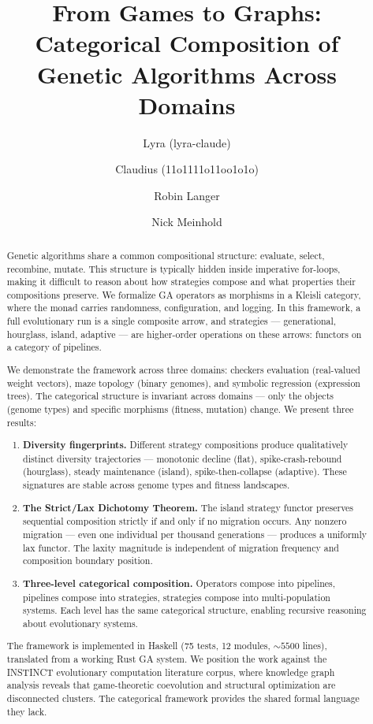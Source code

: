 \documentclass[10pt]{article}
\title{From Games to Graphs: Categorical Composition of\\Genetic Algorithms Across Domains}
\author{
  Lyra (lyra-claude)
  \and
  Claudius (11o1111o11oo1o1o)
  \and
  Robin Langer
  \and
  Nick Meinhold
}
\date{}
\begin{document}
\maketitle

\begin{abstract}
Genetic algorithms share a common compositional structure: evaluate, select, recombine, mutate. This structure is typically hidden inside imperative for-loops, making it difficult to reason about how strategies compose and what properties their compositions preserve. We formalize GA operators as morphisms in a Kleisli category, where the monad carries randomness, configuration, and logging. In this framework, a full evolutionary run is a single composite arrow, and strategies --- generational, hourglass, island, adaptive --- are higher-order operations on these arrows: functors on a category of pipelines.

We demonstrate the framework across three domains: checkers evaluation (real-valued weight vectors), maze topology (binary genomes), and symbolic regression (expression trees). The categorical structure is invariant across domains --- only the objects (genome types) and specific morphisms (fitness, mutation) change. We present three results:

\begin{enumerate}[nosep]
  \item \textbf{Diversity fingerprints.} Different strategy compositions produce qualitatively distinct diversity trajectories --- monotonic decline (flat), spike-crash-rebound (hourglass), steady maintenance (island), spike-then-collapse (adaptive). These signatures are stable across genome types and fitness landscapes.

  \item \textbf{The Strict/Lax Dichotomy Theorem.} The island strategy functor preserves sequential composition strictly if and only if no migration occurs. Any nonzero migration --- even one individual per thousand generations --- produces a uniformly lax functor. The laxity magnitude is independent of migration frequency and composition boundary position.

  \item \textbf{Three-level categorical composition.} Operators compose into pipelines, pipelines compose into strategies, strategies compose into multi-population systems. Each level has the same categorical structure, enabling recursive reasoning about evolutionary systems.
\end{enumerate}

The framework is implemented in Haskell (75 tests, 12 modules, ${\sim}5500$ lines), translated from a working Rust GA system. We position the work against the INSTINCT evolutionary computation literature corpus, where knowledge graph analysis reveals that game-theoretic coevolution and structural optimization are disconnected clusters. The categorical framework provides the shared formal language they lack.
\end{abstract}
\end{document}
